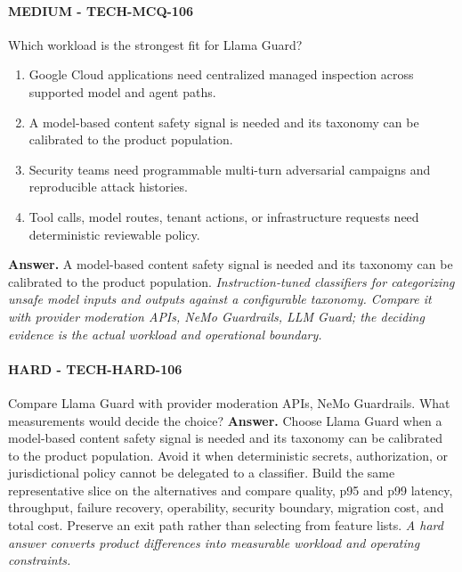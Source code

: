 \paragraph{MEDIUM - TECH-MCQ-106} Which workload is the strongest fit for Llama Guard?
\begin{enumerate}[label=\Alph*.]
\item Google Cloud applications need centralized managed inspection across supported model and agent paths.
\item A model-based content safety signal is needed and its taxonomy can be calibrated to the product population.
\item Security teams need programmable multi-turn adversarial campaigns and reproducible attack histories.
\item Tool calls, model routes, tenant actions, or infrastructure requests need deterministic reviewable policy.
\end{enumerate}
\textbf{Answer.} A model-based content safety signal is needed and its taxonomy can be calibrated to the product population.
\textit{Instruction-tuned classifiers for categorizing unsafe model inputs and outputs against a configurable taxonomy. Compare it with provider moderation APIs, NeMo Guardrails, LLM Guard; the deciding evidence is the actual workload and operational boundary.}
\paragraph{HARD - TECH-HARD-106} Compare Llama Guard with provider moderation APIs, NeMo Guardrails. What measurements would decide the choice?
\textbf{Answer.} Choose Llama Guard when a model-based content safety signal is needed and its taxonomy can be calibrated to the product population. Avoid it when deterministic secrets, authorization, or jurisdictional policy cannot be delegated to a classifier. Build the same representative slice on the alternatives and compare quality, p95 and p99 latency, throughput, failure recovery, operability, security boundary, migration cost, and total cost. Preserve an exit path rather than selecting from feature lists.
\textit{A hard answer converts product differences into measurable workload and operating constraints.}
